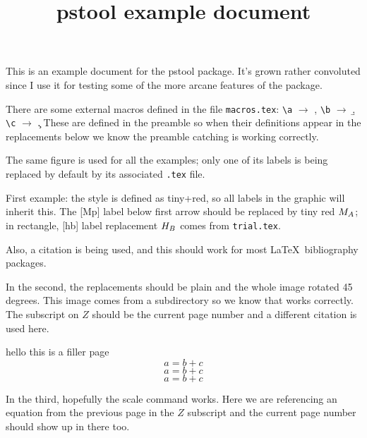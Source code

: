 \documentclass[12pt]{memoir}
\newif\ifNAT
\begin{document}

\title{\textsf{pstool} example document}
\maketitle

This is an example document for the \textsf{pstool} package. It's grown rather convoluted since I use it for testing some of the more arcane features of the package.

There are some external macros defined in the file \texttt{macros.tex}: \verb|\a| $\to$ \a, \verb|\b| $\to$ \b, \verb|\c| $\to$ \c. These are defined in the preamble so when their definitions appear in the replacements below we know the preamble catching is working correctly.

The same figure is used for all the examples; only one of its labels is being replaced by default by its associated \verb|.tex| file.

\newpage

First example: the style is defined as tiny+red, so all labels in the graphic will inherit this. The [Mp] label below first arrow should be replaced by tiny red $M_A$; in rectangle,  [hb] label replacement $H_B$ comes from \texttt{trial.tex}.

\begin{center}
\end{center}

Also, a citation is being used, and this should work for most \LaTeX\ bibliography packages.

\clearpage
In the second, the replacements should be plain and the whole image rotated 45 degrees.
This image comes from a subdirectory so we know that works correctly.
The subscript on $Z$ should be the current page number and a different citation is used here.

\begin{center}
\end{center}


\frontmatter
hello this is a filler page
\begin{equation}
a=b+c\label{eq1}
\end{equation}
\begin{equation}
a=b+c\label{eq2}
\end{equation}
\begin{equation}
a=b+c\label{eq3}
\end{equation}

\newpage
In the third, hopefully the scale command works.
Here we are referencing an equation from the previous page in the $Z$ subscript and the current page number should show up in there too.

\begin{center}
\end{center}

\ifNAT
  
  
\else
  \printbibliography
\fi
\end{document}
